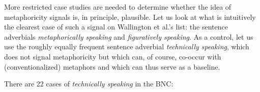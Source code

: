 More restricted case studies are needed to determine whether the idea of metaphoricity  signals  is, in principle, plausible. Let us look at what is intuitively the clearest case of such a signal on Wallington et al.'s list: the sentence adverbials  \textit{metaphorically speaking} and \textit{figuratively speaking}. As a control, let us use the roughly equally frequent sentence adverbial  \textit{technically speaking}, which does not signal metaphoricity  but which can, of course, co\hyp{}occur with (conventionalized)  metaphors and which can thus serve as a baseline.

There are 22 cases of \textit{technically speaking} in the  BNC:

